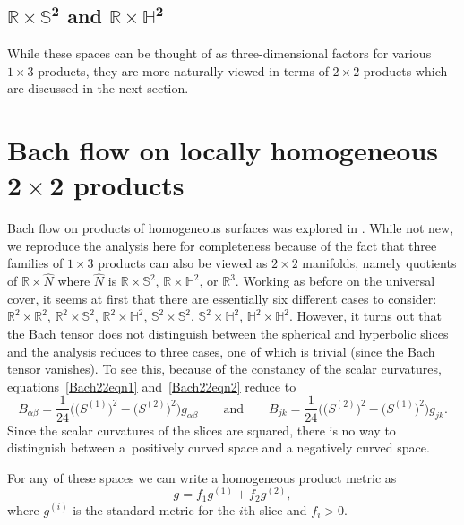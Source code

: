 \documentclass[10pt,a4paper]{amsart}
\numberwithin{equation}{section}
\begin{document}
\subsection[$\mathbb{R} \times \mathbb{S}^2$ and $\mathbb{R} \times \mathbb{H}^2$]{$\boldsymbol{\mathbb{R} \times \mathbb{S}^2}$ and $\boldsymbol{\mathbb{R} \times \mathbb{H}^2}$}

While these spaces can be thought of as three-dimensional factors for various $1 \times 3$ products, they are more naturally viewed in terms of $2 \times 2$ products which are discussed in the next section.

\section[Bach flow on locally homogeneous $2 \times 2$ products]{Bach flow on locally homogeneous $\boldsymbol{2 \times 2}$ products} \label{22flowsec}

Bach flow on products of homogeneous surfaces was explored in \cite{DasKar}. While not new, we reproduce the analysis here for completeness because of the fact that three families of $1 \times 3$ products can also be viewed as $2 \times 2$ manifolds, namely quotients of $\mathbb{R} \times \widehat{N}$ where $\widehat{N}$ is $\mathbb{R} \times \mathbb{S}^2$, $\mathbb{R} \times\mathbb{H}^2$, or $\mathbb{R}^3$. Working as before on the universal cover, it seems at first that there are essentially six different cases to consider: $\mathbb{R}^2 \times \mathbb{R}^2$, $\mathbb{R}^2 \times \mathbb{S}^2$, $\mathbb{R}^2 \times \mathbb{H}^2$, $\mathbb{S}^2 \times \mathbb{S}^2$, $\mathbb{S}^2 \times \mathbb{H}^2$, $\mathbb{H}^2 \times \mathbb{H}^2$. However, it turns out that the Bach tensor does not distinguish between the spherical and hyperbolic slices and the analysis reduces to three cases, one of which is trivial (since the Bach tensor vanishes). To see this, because of the constancy of the scalar curvatures, equations~\eqref{Bach22eqn1} and~\eqref{Bach22eqn2} reduce to
\[
B_{\alpha \beta} = \frac{1}{24} \big(\big(S^{(1)}\big)^2 - \big(S^{(2)}\big)^2 \big) g_{\alpha \beta}
\qquad \text{and} \qquad
B_{jk} = \frac{1}{24} \big(\big(S^{(2)}\big)^2 - \big(S^{(1)}\big)^2 \big) g_{jk}.
\]
Since the scalar curvatures of the slices are squared, there is no way to distinguish between a~positively curved space and a negatively curved space.

For any of these spaces we can write a homogeneous product metric as
\[
g = f_1 g^{(1)} + f_2 g^{(2)},
\]
where $g^{(i)}$ is the standard metric for the $i$th slice and $f_i > 0$.
\end{document}
